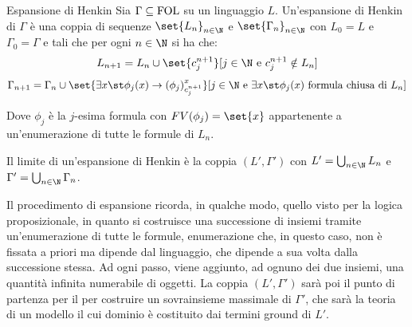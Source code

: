 \begin{definition}{Espansione di Henkin}
  Sia \(\Gamma \subseteq \FOL\) su un linguaggio \(L\). Un'espansione di Henkin di \(\Gamma\) è una coppia di sequenze \(\set{L_n}_{n\in\N}\) e \(\set{\Gamma_n}_{n\in\N}\) con \(L_0 = L\) e \(\Gamma_0 = \Gamma\) e tali che per ogni \(n\in\N\) si ha che:
  \[L_{n+1} = L_n \cup \set{c^{n+1}_{j}}[j \in \N \text{ e } c^{n+1}_{j} \notin L_n]\]
  \[\Gamma_{n+1} = \Gamma_n \cup \set{\exists x\st \phi_j(x) \to \subs{\phi_j}{x}{c^{n+1}_{j}}}[j \in \N \text{ e } \exists x\st \phi_j(x) \text{ formula chiusa di } L_n]\]

  Dove \(\phi_j\) è la \(j\)-esima formula con \(FV(\phi_j) = \set{x}\) appartenente a un'enumerazione di tutte le formule di \(L_n\).

  Il limite di un'espansione di Henkin è la coppia \((L',\Gamma')\) con \(L' = \bigcup_{n\in\N} L_n\) e \(\Gamma' = \bigcup_{n\in\N} \Gamma_n\).
\end{definition}

Il procedimento di espansione ricorda, in qualche modo, quello visto per la logica proposizionale, in quanto si costruisce una successione di insiemi tramite un'enumerazione di tutte le formule, enumerazione che, in questo caso, non è fissata a priori ma dipende dal linguaggio, che dipende a sua volta dalla successione stessa. 
Ad ogni passo, viene aggiunto, ad ognuno dei due insiemi, una quantità infinita numerabile di oggetti.
La coppia \((L',\Gamma')\) sarà poi il punto di partenza per il  per costruire un sovrainsieme massimale di \(\Gamma'\), che sarà la teoria di un modello il cui dominio è costituito dai termini ground di \(L'\).


